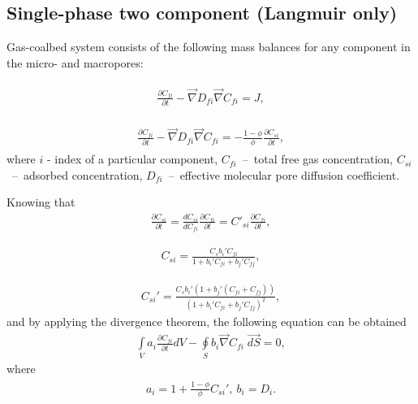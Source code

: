 \documentclass[a4paper,14pt,english]{extreport}
\begin{document}
 \subsection*{Single-phase two component (Langmuir only)}
Gas-coalbed system consists of the following mass balances for any component in the micro- and macropores:

\begin{eqnarray}
\begin{gathered}
\label{eq:diffusuin_multicomp_diff}
\frac{\partial C_{fi}}{\partial t} - \vec{\nabla} D_{fi} \vec{\nabla}C_{fi} = J,
\end{gathered}
\end{eqnarray}

\begin{eqnarray}
\begin{gathered}
\label{eq:diffusuin_multicomp_diff}
\frac{\partial C_{fi}}{\partial t} - \vec{\nabla} D_{fi} \vec{\nabla}C_{fi} = - \frac{1 - \phi}{\phi} \frac{\partial C_{si}}{\partial t},
\end{gathered}
\end{eqnarray}
where $i$ - index of  a particular component, $C_{fi}$~--~total free gas concentration, $C_{si}$~--~adsorbed concentration, $D_{fi}$~--~effective molecular pore diffusion coefficient.

Knowing that
\begin{eqnarray}
\label{eq:variable_replace_timeder}
\frac{\partial C_{si}}{\partial t} =  \frac{dC_{si}}{dC_{fi}}\frac{\partial C_{fi}}{\partial t} = C'_{si}\frac{\partial C_{fi}}{\partial t},
\end{eqnarray}

\begin{eqnarray}
\label{eq:conc_sorption}
C_{si} =  \frac{C_{s} b_{i}' C_{fi}}{1+b_{i}'C_{fi}+b_{j}'C_{fj}},
\end{eqnarray}

\begin{eqnarray}
\label{eq:conc_sorption_deriv}
C_{si}' =  \frac{C_{s}b_{i}' \left(1+b_{j}'\left(C_{fi}+C_{fj}\right)\right)}{\left(1+b_{i}'C_{fi}+b_{j}'C_{fj}\right)^2},
\end{eqnarray}
and by applying the divergence theorem, the following equation can be obtained
\begin{eqnarray}
\label{eq:diffusuin_multicomp_integral}
\int \limits_{V} a_{i} \frac{\partial C_{fi}}{\partial t} dV - \oint \limits_{S} b_{i} \vec{\nabla}C_{fi} \; \vec{dS} = 0,
\end{eqnarray}
where
\begin{eqnarray}
\begin{gathered}
\label{eq:alpha}
a_{i}  =  1+\frac{1 - \phi}{\phi}C_{si}', \: b_{i}  = D_{i}.
\end{gathered}
\end{eqnarray}
\end{document}
